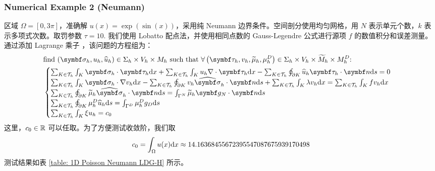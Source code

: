 \subsubsection{Numerical Example 2 (Neumann)}

区域 \(\Omega = [0,3\pi]\)，准确解 \(u(x) = \exp\left(\sin(x)\right)\)，采用纯 Neumann 边界条件。空间剖分使用均匀网格，用 \(N\) 表示单元个数，\(k\) 表示多项式次数。取罚参数 \(\tau = 10\). 我们使用 Lobatto 配点法，并使用相同点数的 Gauss-Legendre 公式进行源项 \(f\) 的数值积分和误差测量。通过添加 Lagrange 乘子 \cite{10.1007/BF01436561}，该问题的方程组为：
\begin{equation}
	\begin{aligned}
		& \text{find \(\left(\bm\sigma_{h}, u_{h}, \widehat{u}_{h}\right) \in \Sigma_{h}\times V_{h}\times M_{h}\) such that \(\forall \left(\bm\tau_{h}, v_{h}, \widetilde{\mu}_{h}, \mu_{h}^{D}\right)\in\Sigma_{h}\times V_{h} \times \widetilde{M}_{h} \times M_{h}^{D}\):} \\
		& \begin{cases}
			\sum_{K \in \mathcal{T}_{h}} \int_{K} \bm\sigma_h \cdot \bm\tau_{h} \d x + \sum_{K \in \mathcal{T}_{h}} \int_{K} u_{h} \nabla \cdot \bm\tau_{h} \d x - \sum_{K \in \mathcal{T}_{h}} \oint_{\partial K} \widehat{u}_{h} \bm\tau_{h} \cdot \bm n \d s = 0 \\
			\sum_{K \in \mathcal{T}_{h}} \int_{K} \bm\sigma_{h} \cdot \nabla v_{h} \d x - \sum_{K \in \mathcal{T}_{h}} \oint_{\partial K} v_{h} \widehat{\bm\sigma}_{h} \cdot \bm n \d s + \sum_{K \in \mathcal{T}_{h}} \int_{K} \lambda v_{h} \d x = \sum_{K \in \mathcal{T}_{h}} \int_{K} f v_{h} \d x \\
			\sum_{K \in \mathcal{T}_{h}} \oint_{\partial K} \widetilde{\mu}_{h} \widehat{\bm\sigma}_{h} \cdot \bm n \d s = \int_{\Gamma^{N}} \widetilde{\mu}_{h} \bm g_{N} \cdot \bm n \d s \\
			\sum_{K \in \mathcal{T}_{h}} \oint_{\partial K} \mu_{h}^{D} \widehat{u}_{h} \d s = \int_{\Gamma^{D}} \mu_{h}^{D} g_{D} \d s \\
			\sum_{K \in \mathcal{T}_{h}} \int_{K} \xi u_{h} = c_0
		\end{cases}
	\end{aligned}
\end{equation}
这里，\(c_0 \in \mathbb{R}\) 可以任取。为了方便测试收敛阶，我们取
\begin{equation}
	c_0 = \int_{\Omega} u(x) \mathrm{d} x \approx 14.16368455672395547087675939170498
\end{equation}
测试结果如表 \ref{table: 1D Poisson Neumann LDG-H} 所示。

